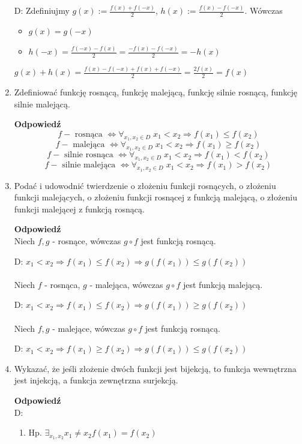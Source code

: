 \documentclass[12pt,a4paper]{article}
\newcounter{twierdzenie}
\theoremstyle{break}
\newcommand{\Odp}[1]{
		\begin{mdframed}[style=zadanie]
			\textbf{Odpowiedź}\\
			#1
		\end{mdframed}
	}
\begin{document}
\begin{enumerate}[1.]
{		D: Zdefiniujmy $g(x):=\frac{f(x)+f(-x)}{2}$, $h(x):=\frac{f(x)-f(-x)}{2}$. Wówczas
		\begin{itemize}
			\item $g(x)=g(-x)$
			\item $h(-x)=\frac{f(-x)-f(x)}{2}=\frac{-f(x)-f(-x)}{2}=-h(x)$
		\end{itemize}
		
		$g(x)+h(x)=\frac{f(x)-f(-x)+f(x)+f(-x)}{2}=\frac{2f(x)}{2}=f(x)$  
	}
	
	\item Zdeﬁniować funkcję rosnącą, funkcję malejącą, funkcję silnie rosnącą, funkcję silnie malejącą.
	\Odp{
		$$f-\text{ rosnąca } \Leftrightarrow \forall_{x_1,x_2\in D}\; x_1<x_2\Rightarrow f(x_1)\leq f(x_2)$$
		$$f-\text{ malejąca } \Leftrightarrow \forall_{x_1,x_2\in D}\; x_1<x_2\Rightarrow f(x_1)\geq f(x_2)$$
		$$f-\text{ silnie rosnąca } \Leftrightarrow \forall_{x_1,x_2\in D}\; x_1<x_2\Rightarrow f(x_1)< f(x_2)$$
		$$f-\text{ silnie malejąca } \Leftrightarrow \forall_{x_1,x_2\in D}\; x_1<x_2\Rightarrow f(x_1)> f(x_2)$$
		
	}
	
	\item Podać i udowodnić twierdzenie o złożeniu funkcji rosnących, o złożeniu funkcji malejących, o złożeniu funkcji rosnącej z funkcją malejącą, o złożeniu funkcji malejącej z funkcją rosnącą.
	\Odp{
		Niech $f,g$ - rosnące, wówczas $g\circ f$ jest funkcją rosnącą.
		
		D: $x_1<x_2 \Rightarrow f(x_1)\leq f(x_2) \Rightarrow g(f(x_1))\leq g(f(x_2))$\\\\
		
		Niech $f$ - rosnąca, $g$ - malejąca, wówczas $g\circ f$ jest funkcją malejącą.
		
		D: $x_1<x_2 \Rightarrow f(x_1)\leq f(x_2) \Rightarrow g(f(x_1))\geq g(f(x_2))$\\\\
		
		Niech $f,g$ - malejące, wówczas $g\circ f$ jest funkcją rosnącą.
		
		D: $x_1<x_2 \Rightarrow f(x_1)\geq f(x_2) \Rightarrow g(f(x_1))\leq g(f(x_2))$
	}
	
	\item Wykazać, że jeśli złożenie dwóch funkcji jest bijekcją, to funkcja wewnętrzna jest	injekcją, a funkcja zewnętrzna surjekcją.
	\Odp{
		D: 
		\begin{enumerate}[(1)]
			\item Hp. $\exists_{x_1,x_2} x_1\neq x_2 f(x_1)=f(x_2)$
			

\end{enumerate}}
\end{enumerate}
\end{document}
